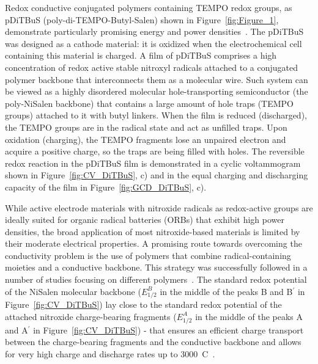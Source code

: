 Redox conductive conjugated polymers containing TEMPO redox groups, as pDiTBuS (poly-di-TEMPO-Butyl-Salen) shown in Figure~\ref{fig:Figure_1}, demonstrate particularly promising energy and power densities~\cite{Vereshchagin2020}. The pDiTBuS was designed as a cathode material: it is oxidized when the electrochemical cell containing this material is charged. A film of pDiTBuS comprises a high concentration of redox active stable nitroxyl radicals attached to a conjugated polymer backbone that interconnects them as a molecular wire. Such system can be viewed as a highly disordered molecular hole-transporting semiconductor (the poly-NiSalen backbone) that contains a large amount of hole traps (TEMPO groups) attached to it with butyl linkers. When the film is reduced (discharged), the TEMPO groups are in the radical state and act as unfilled traps. Upon oxidation (charging), the TEMPO fragments lose an unpaired electron and acquire a positive charge, so the traps are being filled with holes. The reversible redox reaction in the pDiTBuS film is demonstrated in a cyclic voltammogram shown in Figure~\ref{fig:CV_DiTBuS}, c) and in the equal charging and discharging capacity of the film in Figure~\ref{fig:GCD_DiTBuS}, c).

\par
While active electrode materials with nitroxide radicals as redox-active groups are ideally suited for organic radical batteries (ORBs) that exhibit high power densities, the broad application of most nitroxide-based materials is limited by their moderate electrical properties. A promising route towards overcoming the conductivity problem is the use of polymers that combine radical-containing moieties and a conductive backbone. This strategy was successfully followed in a number of studies focusing on different polymers~\cite{oyaizu2015_polymerjournal, bahaceci2013_jpowersources, katsumata2006_mrc, xu2014_electact, aydin2015_jsoistatelect, schwartz2018_synthmet}. The standard redox potential of the NiSalen molecular backbone ($E_{1/2}^B$ in the middle of the peaks B and B$^\prime$ in Figure~\ref{fig:CV_DiTBuS}) lay close to the standard redox potential of the attached nitroxide charge-bearing fragments ($E_{1/2}^A$ in the middle of the peaks A and A$^\prime$ in Figure~\ref{fig:CV_DiTBuS}) - that ensures an efficient charge transport between the charge-bearing fragments and the conductive backbone and allows for very high charge and discharge rates up to 3000~C~\cite{Vereshchagin2020,Kulikov2022}.

